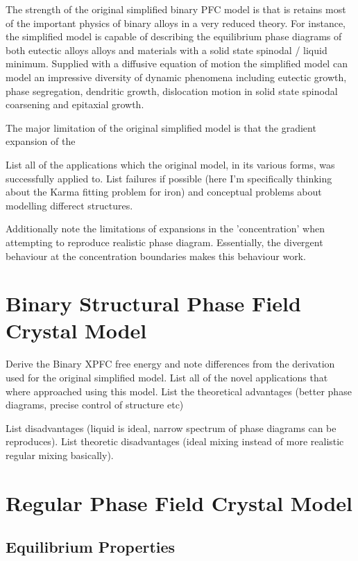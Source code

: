 The strength of the original simplified binary PFC model is that is retains
most of the important physics of binary alloys in a very reduced theory. For
instance, the simplified model is capable of describing the equilibrium phase
diagrams of both eutectic alloys alloys and materials with a solid state
spinodal / liquid minimum.  Supplied with a diffusive equation of motion the
simplified model can model an impressive diversity of dynamic phenomena
including eutectic growth, phase segregation, dendritic growth, dislocation
motion in solid state spinodal coarsening and epitaxial growth.

The major limitation of the original simplified model is that the gradient
expansion of the 

{   
    \color{ForestGreen} List all of the applications which the original model,
    in its various forms, was successfully applied to. List failures if
    possible (here I'm specifically thinking about the Karma fitting problem
    for iron) and conceptual problems about modelling differect structures. 

    Additionally note the limitations of expansions in the 'concentration' when
    attempting to reproduce realistic phase diagram. Essentially, the divergent
    behaviour at the concentration boundaries makes this behaviour work.
}



\section{Binary Structural Phase Field Crystal Model} %

{
    \color{ForestGreen} Derive the Binary XPFC free energy and note differences
    from the derivation used for the original simplified model. List all of the
    novel applications that where approached using this model. List the theoretical
    advantages (better phase diagrams, precise control of structure etc)

    List disadvantages (liquid is ideal, narrow spectrum of phase diagrams can
    be reproduces). List theoretic disadvantages (ideal mixing instead of more
    realistic regular mixing basically).
}

\section{Regular Phase Field Crystal Model} %

{

}

\subsection{Equilibrium Properties} %
